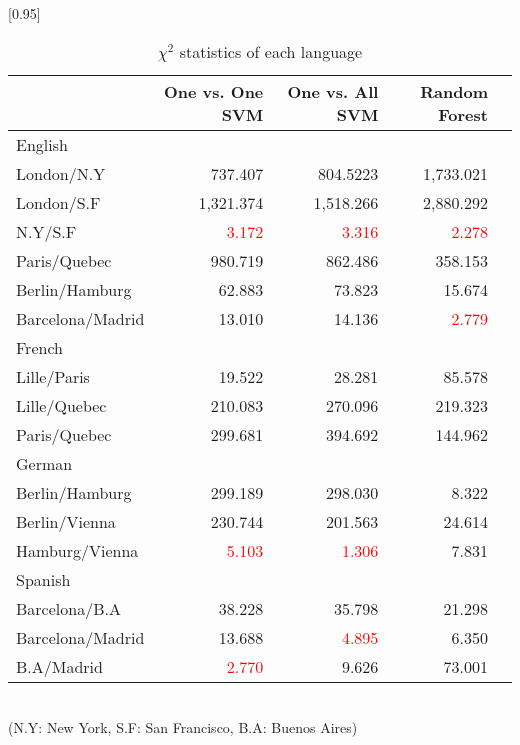 \documentclass[twocolumn]{article}
\begin{document}
\begin{table}[ht]
	\caption{$\chi^2$ statistics of each language}
	\scalebox{0.7}[0.95]{
	\begin{tabular}{|l|r|r|r|r|} \hline
	{}&One vs. One SVM &One vs. All SVM&Random Forest\\ \hline \hline
	English&{} & {} & {} \\ \hline
	London/N.Y& 737.407 & 804.5223 &1,733.021 \\
	London/S.F& 1,321.374 &1,518.266& 2,880.292\\
	N.Y/S.F & \textcolor{red}{3.172}&\textcolor{red}{3.316}&\textcolor{red}{2.278} \\
	Paris/Quebec & 980.719& 862.486& 358.153\\
	Berlin/Hamburg & 62.883 & 73.823 & 15.674 \\
	Barcelona/Madrid & 13.010& 14.136 & \textcolor{red}{2.779} \\ \hline

	French &{} & {} & {} \\ \hline
	Lille/Paris & 19.522 &28.281& 85.578\\
	Lille/Quebec & 210.083 &270.096& 219.323\\
	Paris/Quebec & 299.681 &394.692& 144.962\\ \hline

	German &{} & {} & {} \\\hline
	Berlin/Hamburg& 299.189 &298.030&8.322 \\
	Berlin/Vienna& 230.744&201.563& 24.614\\
	Hamburg/Vienna& \textcolor{red}{5.103} &\textcolor{red}{1.306}& 7.831\\ \hline

	Spanish&{} & {} & {} \\\hline
	Barcelona/B.A& 38.228 & 35.798 & 21.298 \\
	Barcelona/Madrid & 13.688 & \textcolor{red}{4.895} & 6.350\\
	B.A/Madrid& \textcolor{red}{2.770} & 9.626 & 73.001\\ \hline

	\end{tabular}
	}
	\label{tab:result_chi_square}
	\\(N.Y: New York, S.F: San Francisco,  B.A: Buenos Aires)
\end{table}
\end{document}
